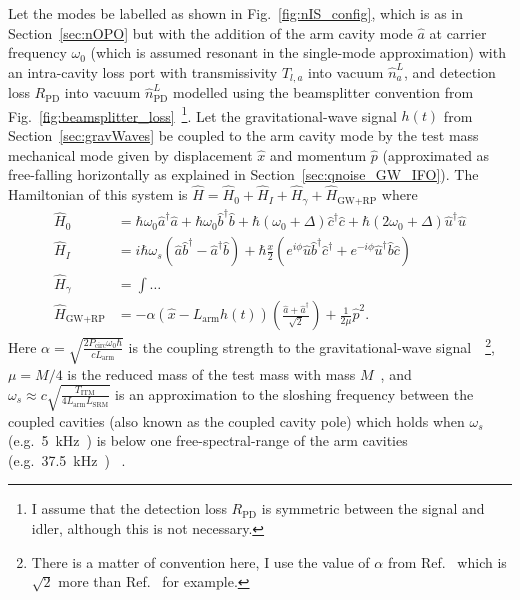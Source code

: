 Let the modes be labelled as shown in Fig.~\ref{fig:nIS_config}, which is as in Section~\ref{sec:nOPO} but with the addition of the arm cavity mode $\hat a$ at carrier frequency $\omega_0$ (which is assumed resonant in the single-mode approximation) with an intra-cavity loss port with transmissivity $T_{l,a}$ into vacuum $\hat n^L_a$, and detection loss $R_\text{PD}$ into vacuum $\hat n^L_\text{PD}$ modelled using the beamsplitter convention from Fig.~\ref{fig:beamsplitter_loss}~\footnote{I assume that the detection loss $R_\text{PD}$ is symmetric between the signal and idler, although this is not necessary.}. Let the gravitational-wave signal $h(t)$ from Section~\ref{sec:gravWaves} be coupled to the arm cavity mode by the test mass mechanical mode given by displacement $\hat x$ and momentum $\hat p$ (approximated as free-falling horizontally as explained in Section~\ref{sec:qnoise_GW_IFO}).
The Hamiltonian of this system is $\hat H = \hat H_0 + \hat H_I + \hat H_\gamma + \hat H_\text{GW+RP}$ where~\cite{} 
\begin{align}
\hat H_0 &= \hbar \omega_0 \hat a^\dag \hat a + \hbar \omega_0 \hat b^\dag \hat b+ \hbar (\omega_0+\Delta) \hat c^\dag \hat c + \hbar (2\omega_0+\Delta) \hat u^\dag \hat u\\
\hat H_I &= i\hbar\omega_s(\hat a\hat b^\dag-\hat a^\dag\hat b) + \hbar \frac{x}{2} (e^{i\phi} \hat u \hat b^\dag \hat c^\dag+e^{-i\phi} \hat u^\dag \hat b \hat c) \\
\hat H_\gamma &= \int \ldots \\
\hat H_\text{GW+RP} &= -\alpha (\hat{x}-L_\mathrm{arm}h(t))\left(\frac{\hat{a}+\hat{a}^\dag}{\sqrt{2}}\right)+\frac{1}{2\mu}\hat{p}^2.
\end{align}
Here $\alpha=\sqrt{\frac{2 P_\text{circ} \omega_0 \hbar}{c  L_\text{arm}}}$ is the coupling strength to the gravitational-wave signal~\cite{liBroadbandSensitivityImprovement2020}~\footnote{There is a matter of convention here, I use the value of $\alpha$ from Ref.~\cite{liBroadbandSensitivityImprovement2020} which is $\sqrt2$ more than Ref.~\cite{korobkoQuantumExpanderGravitationalwave2019} for example. }, $\mu=M/4$ is the reduced mass  of the test mass with mass $M$~\cite{}, and $\omega_s\approx c\sqrt{\frac{T_\text{ITM}}{4 L_\text{arm} L_\text{SRM}}}$ is an approximation to the sloshing frequency between the coupled cavities (also known as the coupled cavity pole) which holds when $\omega_s$ (e.g.\ 5~kHz~\cite{}) is below one free-spectral-range of the arm cavities (e.g.\ 37.5~kHz~\cite{}) ~\cite{}.
